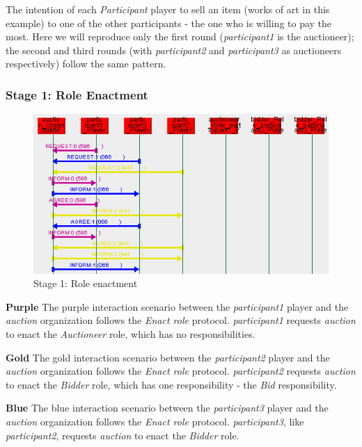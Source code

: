 The intention of each \textit{Participant} player to sell an item (works of art in this example) to one of the other participants - the one who is willing to pay the most.
Here we will reproduce only the first round (\textit{participant1} is the auctioneer); the second and third rounds (with \textit{participant2} and \textit{participant3} as auctioneers respectively) follow the same pattern. 

\subsubsection*{Stage 1: Role Enactment}

\begin{figure}[H]
	\centering
	\includegraphics[width=\textwidth]{images/example3-stage1.png}
	\caption{Stage 1: Role enactment}
	\label{figure:example3-stage1}
\end{figure}

\textbf{Purple} The purple interaction scenario between the \textit{participant1} player and the \textit{auction} organization follows the \textit{Enact role} protocol.
\textit{participant1} requests \textit{auction} to enact the \textit{Auctioneer} role, which has no responsibilities.

\textbf{Gold} The gold interaction scenario between the \textit{participant2} player and the \textit{auction} organization follows the \textit{Enact role} protocol.
\textit{participant2} requests \textit{auction} to enact the \textit{Bidder} role, which has one responsibility - the \textit{Bid} responsibility.

\textbf{Blue} The blue interaction scenario between the \textit{participant3} player and the \textit{auction} organization follows the \textit{Enact role} protocol.
\textit{participant3}, like \textit{participant2}, requests \textit{auction} to enact the \textit{Bidder} role.

